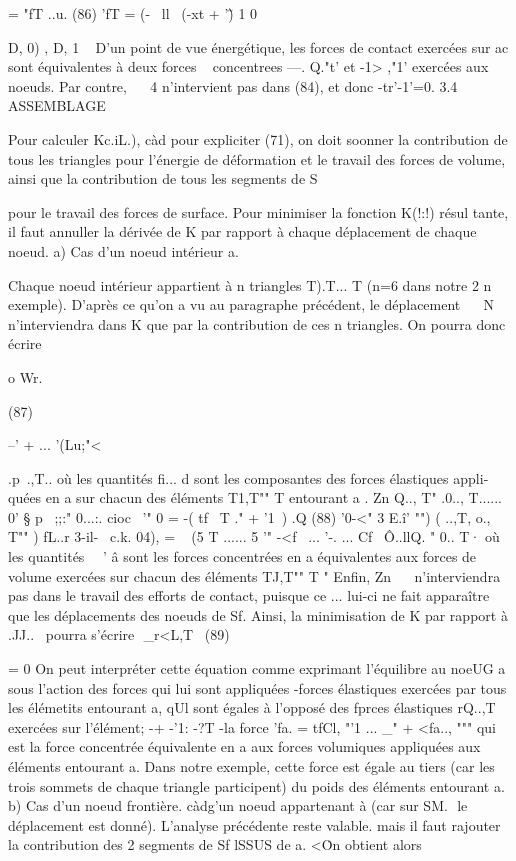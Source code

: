 {{{{{{{{= "fT ..u. 
(86) 'fT = (-~ ll~ (-xt + '\~) 1 0 

D, 0)
, D,
1 
~ 
D'un point de  vue  énergétique,  les  forces  de  contact  exercées  
sur  ac  sont  équivalentes  à deux  forces  ~ concentrees  ---. Q."t'  et  -1> ,"1'  exercées  
aux  noeuds.  Par contre,  ~~ 4  n'intervient  pas  dans  (84),  et donc  -tr'-1'=0.  
3.4 ASSEMBLAGE  

Pour calculer Kc.iL.), càd pour expliciter (71), on doit soonner la contribution de tous les triangles pour l'énergie de déformation et le 
travail des forces de volume, ainsi que la contribution de tous les segments de S{ pour le travail des forces de surface. Pour minimiser la fonction K(!:!) résul tante, il faut annuller la dérivée de K par rapport à chaque déplacement de chaque noeud. 
a) Cas d'un noeud intérieur a. 

Chaque noeud intérieur appartient à n triangles T).T... T (n=6 dans notre
2 n exemple). D'après ce qu'on a vu au paragraphe précédent, le déplacement ~~ 
N 
n'interviendra dans K que par la contribution de ces n triangles. On pour­ra donc écrire 

o Wr.

(87) 


--' + ... 
'(Lu;"< 

.p~.,T..
où les quantités fi... d sont les composantes des forces élastiques appli­quées en a sur chacun des éléments T1,T"" T entourant a .
Zn 
Q.., T" .0.., T......
0' § p~ ;;:" 0...:. cioc~ '" 0 = -( tf~ T ." + '1\ ) 
.Q
(88) 	'0-<" 3 E.î' "") ( ..,T, o., T"" ) 
fL..r 3-il-~ c.k. 04), = ~ (5 T ...... 5 '" -<f~ ... '-. ... Cf~
Ô..llQ. 
" 
0.. T· 
où les quantités ~~' â sont les forces concentrées en a équivalentes aux forces de volume exercées sur chacun des éléments TJ,T"" T " Enfin,
Zn ~~ n'interviendra pas dans le travail des efforts de contact, puisque ce
... 
lui-ci ne 	fait apparaître que les déplacements des noeuds de Sf. Ainsi, la minimisation de K par rapport à .JJ..~ pourra s'écrire
 
_r<L,T~
(89) 

= 0 
On peut interpréter cette équation comme exprimant l'équilibre au noeUG a sous l'action des forces qui lui sont appliquées -forces élastiques exercées par tous les élémetits entourant a, qUl sont égales à l'opposé des fprces élastiques rQ..,T~ exercées sur l'élément; -+ -'1: -?T 
-la force 'fa. = tfCl, "'1 ... _" + <fa.., """ qui est la force concentrée équivalente en a aux forces volumiques appliquées aux éléments entourant a. Dans notre exemple, cette force est égale au tiers (car les trois sommets de chaque triangle participent) du poids des éléments entourant a. 
b) Cas d'un noeud frontière. càdg'un noeud appartenant à (car sur SM.
 le déplacement est donné). L'analyse précédente reste valable. mais il 
faut rajouter la contribution des 2 segments de Sf lSSUS de a. <\. 
On obtient alors 

}}}}}}}}}
